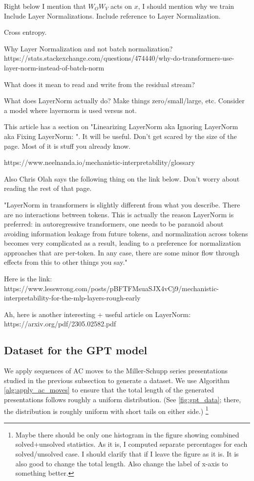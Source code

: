 Right below I mention that $W_O W_V$ acts on $x$, I should mention why we train 
Include Layer Normalizations. 
Include reference to Layer Normalization. 

Cross entropy.

Why Layer Normalization and not batch normalization? https://stats.stackexchange.com/questions/474440/why-do-transformers-use-layer-norm-instead-of-batch-norm

What does it mean to read and write from the residual stream? 

What does LayerNorm actually do? Make things zero/small/large, etc. Consider a model where layernorm is used versus not. 

This article has a section on "Linearizing LayerNorm aka Ignoring LayerNorm aka Fixing LayerNorm: ". It will be useful. Don't get scared by the size of the page. Most of it is stuff you already know.

https://www.neelnanda.io/mechanistic-interpretability/glossary

Also Chris Olah says the following thing on the link below. Don't worry about reading the rest of that page.

"LayerNorm in transformers is slightly different from what you describe. There are no interactions between tokens. This is actually the reason LayerNorm is preferred: in autoregressive transformers, one needs to be paranoid about avoiding information leakage from future tokens, and normalization across tokens becomes very complicated as a result, leading to a preference for normalization approaches that are per-token. In any case, there are some minor flow through effects from this to other things you say."

Here is the link: https://www.lesswrong.com/posts/pBFTFMsuaSJX4vCj9/mechanistic-interpretability-for-the-mlp-layers-rough-early

Ah, here is another interesting + useful article on LayerNorm: https://arxiv.org/pdf/2305.02582.pdf


\subsection{Dataset for the GPT model}

We apply sequences of AC moves to the Miller-Schupp series presentations studied in the previous subsection to generate a dataset.
We use Algorithm \autoref{alg:apply_ac_moves} to ensure that the total length of the generated presentations follows roughly a uniform distribution.
(See \autoref{fig:gpt_data}; there, the distribution is roughly uniform with short tails on either side.)
\footnote{Maybe there should be only one histogram in the figure showing combined solved+unsolved statistics.
As it is, I computed separate percentages for each solved/unsolved case.
I should clarify that if I leave the figure as it is.
It is also good to change the total length.
Also change the label of x-axis to something better.}

